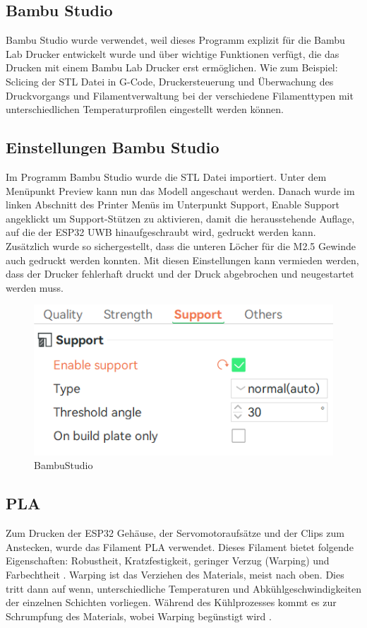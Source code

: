\subsection{Bambu Studio}
Bambu Studio wurde verwendet, weil dieses Programm explizit für die Bambu Lab Drucker entwickelt wurde und über wichtige Funktionen verfügt, die das Drucken mit einem Bambu Lab Drucker erst ermöglichen. Wie zum Beispiel: Sclicing der STL Datei in G-Code, Druckersteuerung und Überwachung des Druckvorgangs und Filamentverwaltung bei der verschiedene Filamenttypen mit unterschiedlichen Temperaturprofilen eingestellt werden können.


\subsection{Einstellungen Bambu Studio}
Im Programm Bambu Studio wurde die STL Datei importiert. Unter dem Menüpunkt Preview kann nun das Modell angeschaut werden. Danach wurde im linken Abschnitt des Printer Menüs im Unterpunkt Support, Enable Support angeklickt um Support-Stützen zu aktivieren, damit die herausstehende Auflage, auf die der ESP32 UWB hinaufgeschraubt wird, gedruckt werden kann. Zusätzlich wurde so sichergestellt, dass die unteren Löcher für die M2.5 Gewinde auch gedruckt werden konnten. Mit diesen Einstellungen kann vermieden werden, dass der Drucker fehlerhaft druckt und der Druck abgebrochen und neugestartet werden muss.

\begin{figure}[H]
	\centering
	\includegraphics[width=0.5\linewidth]{images/BambuStudio.jpg}
	\caption[BambuStudio]{BambuStudio}
	\label{fig:BambuStudio} 
\end{figure}

\newpage
\subsection{PLA}
Zum Drucken der ESP32 Gehäuse, der Servomotoraufsätze und der Clips zum Anstecken, wurde das Filament PLA verwendet. Dieses Filament bietet folgende Eigenschaften: Robustheit, Kratzfestigkeit, geringer Verzug (Warping) und Farbechtheit \parencite{PLAEigenschaften}. Warping ist das Verziehen des Materials, meist nach oben. Dies tritt dann auf wenn, unterschiedliche Temperaturen und Abkühlgeschwindigkeiten der einzelnen Schichten vorliegen. Während des Kühlprozesses kommt es zur Schrumpfung des Materials, wobei Warping begünstigt wird \parencite{Warping}.

